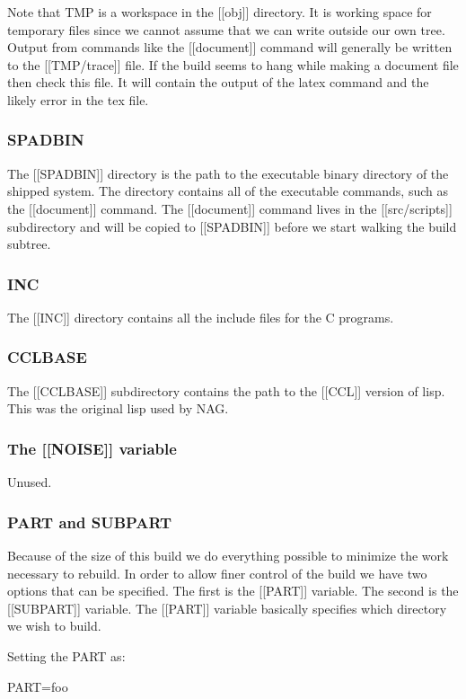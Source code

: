 \documentclass{article}
\begin{document}
Note that TMP is a workspace in the [[obj]] directory. It is
working space for temporary files since we cannot assume that
we can write outside our own tree. Output from commands like
the [[document]] command will generally be written to the
[[TMP/trace]] file. If the build seems to hang while making a
document file then check this file. It will contain the output
of the latex command and the likely error in the tex file.

\subsubsection{SPADBIN}
The [[SPADBIN]] directory is the path to the executable
binary directory of the shipped system. The directory contains
all of the executable commands, such as the [[document]]
command. The [[document]] command lives in the [[src/scripts]]
subdirectory and will be copied to [[SPADBIN]] before we start
walking the build subtree.

\subsubsection{INC}
The [[INC]] directory contains all the include files for the C
programs.

\subsubsection{CCLBASE}
The [[CCLBASE]] subdirectory contains the path to the [[CCL]]
version of lisp. This was the original lisp used by NAG.

\subsubsection{The [[NOISE]] variable }

Unused.

\subsubsection{PART and SUBPART}
Because of the size of this build we do everything possible to
minimize the work necessary to rebuild. In order to allow
finer control of the build we have two options that can be
specified. The first is the [[PART]] variable. The second
is the [[SUBPART]] variable. The [[PART]] variable basically
specifies which directory we wish to build.

Setting the PART as:

PART=foo
\end{document}
